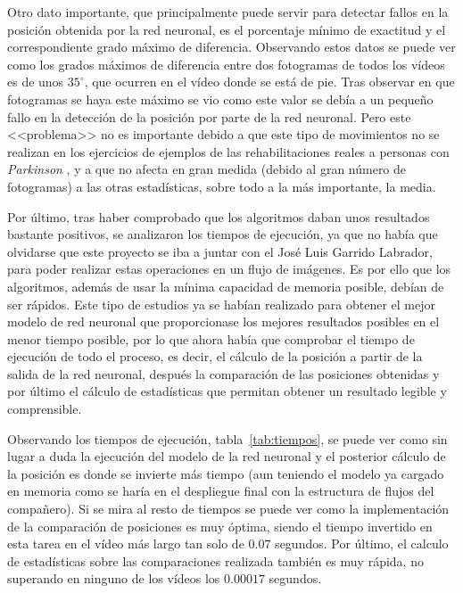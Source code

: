 Otro dato importante, que principalmente puede servir para detectar fallos en la posición obtenida por la red neuronal, es el porcentaje mínimo de exactitud y el correspondiente grado máximo de diferencia. Observando estos datos se puede ver como los grados máximos de diferencia entre dos fotogramas de todos los vídeos es de unos $35^{\circ}$, que ocurren en el vídeo donde se está de pie. Tras observar en que fotogramas se haya este máximo se vio como este valor se debía a un pequeño fallo en la detección de la posición por parte de la red neuronal. Pero este <<problema>> no es importante debido a que este tipo de movimientos no se realizan en los ejercicios de ejemplos de las rehabilitaciones reales a personas con \textit{Parkinson} , y a que no afecta en gran medida (debido al gran número de fotogramas) a las otras estadísticas, sobre todo a la más importante, la media.

Por último, tras haber comprobado que los algoritmos daban unos resultados bastante positivos, se analizaron los tiempos de ejecución, ya que no había que olvidarse que este proyecto se iba a juntar con el José Luis Garrido Labrador, para poder realizar estas operaciones en un flujo de imágenes. Es por ello que los algoritmos, además de usar la mínima capacidad de memoria posible, debían de ser rápidos. Este tipo de estudios ya se habían realizado para obtener el mejor modelo de red neuronal que proporcionase los mejores resultados posibles en el menor tiempo posible, por lo que ahora había que comprobar el tiempo de ejecución de todo el proceso, es decir,  el cálculo de la posición a partir de la salida de la red neuronal, después la comparación de las posiciones obtenidas y por último el cálculo de estadísticas que permitan obtener un resultado legible y comprensible.

Observando los tiempos de ejecución, tabla~\ref{tab:tiempos}, se puede ver como sin lugar a duda la ejecución del modelo de la red neuronal y el posterior cálculo de la posición es donde se invierte más tiempo (aun teniendo el modelo ya cargado en memoria como se haría en el despliegue final con la estructura de flujos del compañero). Si se mira al resto de tiempos se puede ver como la implementación de la comparación de posiciones es muy óptima, siendo el tiempo invertido en esta tarea en el vídeo más largo tan solo de $0.07$ segundos. Por último, el calculo de estadísticas sobre las comparaciones realizada también es muy rápida, no superando en ninguno de los vídeos los $0.00017$ segundos.

